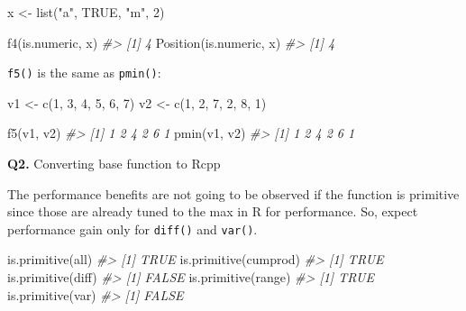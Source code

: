 \documentclass[
]{book}
\newenvironment{Shaded}{\begin{snugshade}}{\end{snugshade}}
\newcommand{\CommentTok}[1]{\textcolor[rgb]{0.56,0.35,0.01}{\textit{#1}}}
\newcommand{\ConstantTok}[1]{\textcolor[rgb]{0.00,0.00,0.00}{#1}}
\newcommand{\DecValTok}[1]{\textcolor[rgb]{0.00,0.00,0.81}{#1}}
\newcommand{\FunctionTok}[1]{\textcolor[rgb]{0.00,0.00,0.00}{#1}}
\newcommand{\NormalTok}[1]{#1}
\newcommand{\OtherTok}[1]{\textcolor[rgb]{0.56,0.35,0.01}{#1}}
\newcommand{\StringTok}[1]{\textcolor[rgb]{0.31,0.60,0.02}{#1}}
\begin{document}
\begin{Shaded}
\begin{Highlighting}[]
\NormalTok{x }\OtherTok{\textless{}{-}} \FunctionTok{list}\NormalTok{(}\StringTok{"a"}\NormalTok{, }\ConstantTok{TRUE}\NormalTok{, }\StringTok{"m"}\NormalTok{, }\DecValTok{2}\NormalTok{)}

\FunctionTok{f4}\NormalTok{(is.numeric, x)}
\CommentTok{\#\textgreater{} [1] 4}
\FunctionTok{Position}\NormalTok{(is.numeric, x)}
\CommentTok{\#\textgreater{} [1] 4}
\end{Highlighting}
\end{Shaded}

\texttt{f5()} is the same as \texttt{pmin()}:

\begin{Shaded}
\begin{Highlighting}[]
\NormalTok{v1 }\OtherTok{\textless{}{-}} \FunctionTok{c}\NormalTok{(}\DecValTok{1}\NormalTok{, }\DecValTok{3}\NormalTok{, }\DecValTok{4}\NormalTok{, }\DecValTok{5}\NormalTok{, }\DecValTok{6}\NormalTok{, }\DecValTok{7}\NormalTok{)}
\NormalTok{v2 }\OtherTok{\textless{}{-}} \FunctionTok{c}\NormalTok{(}\DecValTok{1}\NormalTok{, }\DecValTok{2}\NormalTok{, }\DecValTok{7}\NormalTok{, }\DecValTok{2}\NormalTok{, }\DecValTok{8}\NormalTok{, }\DecValTok{1}\NormalTok{)}

\FunctionTok{f5}\NormalTok{(v1, v2)}
\CommentTok{\#\textgreater{} [1] 1 2 4 2 6 1}
\FunctionTok{pmin}\NormalTok{(v1, v2)}
\CommentTok{\#\textgreater{} [1] 1 2 4 2 6 1}
\end{Highlighting}
\end{Shaded}

\textbf{Q2.} Converting base function to Rcpp

The performance benefits are not going to be observed if the function is primitive since those are already tuned to the max in R for performance. So, expect performance gain only for \texttt{diff()} and \texttt{var()}.

\begin{Shaded}
\begin{Highlighting}[]
\FunctionTok{is.primitive}\NormalTok{(all)}
\CommentTok{\#\textgreater{} [1] TRUE}
\FunctionTok{is.primitive}\NormalTok{(cumprod)}
\CommentTok{\#\textgreater{} [1] TRUE}
\FunctionTok{is.primitive}\NormalTok{(diff)}
\CommentTok{\#\textgreater{} [1] FALSE}
\FunctionTok{is.primitive}\NormalTok{(range)}
\CommentTok{\#\textgreater{} [1] TRUE}
\FunctionTok{is.primitive}\NormalTok{(var)}
\CommentTok{\#\textgreater{} [1] FALSE}
\end{Highlighting}
\end{Shaded}
\end{document}
